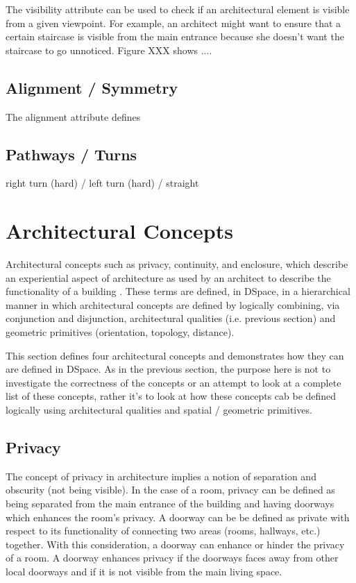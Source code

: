 \documentclass[12pt]{ucthesis}
\begin{document}
The visibility attribute can be used to check if an architectural element is visible from a given viewpoint. For example, an architect might want to ensure that a certain staircase is visible from the main entrance because she doesn't want the staircase to go unnoticed. Figure XXX shows ....  


\subsection{Alignment / Symmetry}
The alignment attribute defines 

\subsection{Pathways / Turns}  right turn (hard) / left turn (hard) / straight 


\section{Architectural Concepts}
Architectural concepts such as privacy, continuity, and enclosure, which describe an experiential aspect of architecture as used by an architect to describe the functionality of a building \cite{Koile}. These terms are defined, in DSpace, in a hierarchical manner in which architectural concepts are defined by logically combining, via conjunction and disjunction, architectural qualities (i.e. previous section) and geometric primitives (orientation, topology, distance). 

This section defines four architectural concepts and demonstrates how they can are defined in DSpace. As in the previous section, the purpose here is not to investigate the correctness of the concepts or an attempt to look at a complete list of these concepts, rather it's to look at how these concepts cab be defined logically using architectural qualities and spatial / geometric primitives.

\subsection{Privacy}
The concept of privacy in architecture implies a notion of separation and obscurity (not being visible). In the case of a room, privacy can be defined as being separated from the main entrance of the building and having doorways which enhances the room's privacy. A doorway can be be defined as private with respect to its functionality of connecting two areas (rooms, hallways, etc.) together. With this consideration, a doorway can enhance or hinder the privacy of a room. A doorway enhances privacy if the doorways faces away from other local doorways and if it is not visible from the main living space. 
\end{document}
